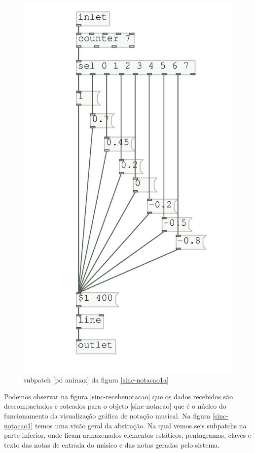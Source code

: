 \documentclass{ppgmus}
\begin{document}
\begin{figure}
\includegraphics[scale=.6]{sinc-notacao1c}
\caption{subpatch [pd animax] da figura \ref{sinc-notacao1a}}
\label{sinc-notacao1c}
\end{figure} 

Podemos observar na figura \ref{sinc-recebenotacao} que os dados recebidos são descompactados e roteados para o objeto
[sinc-notacao] que é o núcleo do funcionamento da visualização gráfica de notação musical.
Na figura \ref{sinc-notacao1} temos uma visão geral da abstração. Na qual vemos seis subpatchs na
parte inferior, onde ficam armazenados elementos estáticos, pentagramas, claves e texto das notas de entrada do
músico e das notas geradas pelo sistema.
\end{document}
